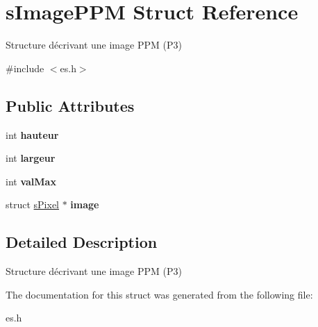 \hypertarget{structs_image_p_p_m}{}\section{s\+Image\+P\+PM Struct Reference}
\label{structs_image_p_p_m}


Structure décrivant une image P\+PM (P3)  




{\ttfamily \#include $<$es.\+h$>$}

\subsection*{Public Attributes}
\begin{DoxyCompactItemize}
\item 
\mbox{\label{structs_image_p_p_m_ab8a1c207163cb1395526a72bfb5a32f8}} 
int {\bfseries hauteur}
\item 
\mbox{\label{structs_image_p_p_m_a5e213de573190dc7c00856fcf8c0b247}} 
int {\bfseries largeur}
\item 
\mbox{\label{structs_image_p_p_m_a411562506066f8659591ea2a067e447a}} 
int {\bfseries val\+Max}
\item 
\mbox{\label{structs_image_p_p_m_a24d8baca3093c63d71d1bf01ac8527cd}} 
struct \mbox{\hyperlink{structs_pixel}{s\+Pixel}} $\ast$ {\bfseries image}
\end{DoxyCompactItemize}


\subsection{Detailed Description}
Structure décrivant une image P\+PM (P3) 

The documentation for this struct was generated from the following file\+:\begin{DoxyCompactItemize}
\item 
es.\+h\end{DoxyCompactItemize}
